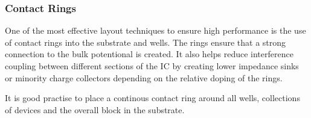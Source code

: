 \documentclass[11pt]{article}
\begin{document}
\begin{figure}[h]
\end{figure}



\subsubsection{Contact Rings}

One of the most effective layout techniques to ensure high performance is the use of contact rings into the substrate and wells. The rings ensure that a strong connection to the bulk potentional is created. It also helps reduce interference coupling between different sections of the IC by creating lower impedance sinks or minority charge collectors depending on the relative doping of the rings.

It is good practise to place a continous contact ring around all wells, collections of devices and the overall block in the substrate.

\begin{figure}[h]
\end{figure}
\end{document}
